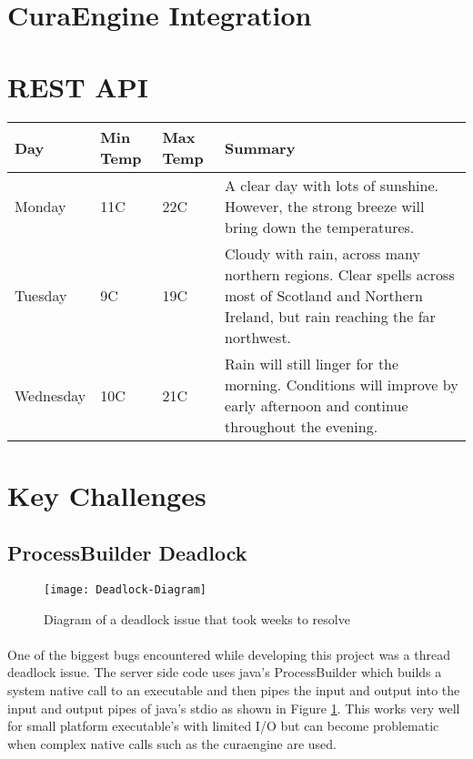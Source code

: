 \section{CuraEngine Integration}

\section{REST API}
\paragraph{}
\begin{center}
    \begin{tabular}{ | l | l | l | p{5cm} |}
    \hline
    Day & Min Temp & Max Temp & Summary \\ \hline
    Monday & 11C & 22C & A clear day with lots of sunshine.  
    However, the strong breeze will bring down the temperatures. \\ \hline
    Tuesday & 9C & 19C & Cloudy with rain, across many northern regions. Clear spells 
    across most of Scotland and Northern Ireland, 
    but rain reaching the far northwest. \\ \hline
    Wednesday & 10C & 21C & Rain will still linger for the morning. 
    Conditions will improve by early afternoon and continue 
    throughout the evening. \\
    \hline
    \end{tabular}
\end{center}


\section{Key Challenges}
\subsection{ProcessBuilder Deadlock}
\begin{figure}[!ht]
  \centering
  \texttt{[image: Deadlock-Diagram]}
  \caption{Diagram of a deadlock issue that took weeks to resolve}
  \label{fig:deadlock-diagram}
\end{figure}
\paragraph{}
One of the biggest bugs encountered while developing this project was a thread deadlock issue. 
The server side code uses java’s ProcessBuilder which builds a system native call to an executable and then pipes the input and output into the input and output pipes of java’s stdio as shown in Figure \ref{fig:deadlock-diagram}.
This works very well for small platform executable’s with limited I/O but can become problematic when complex native calls such as the curaengine are used.

